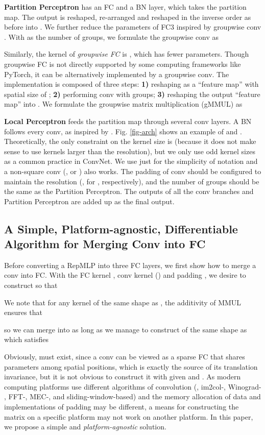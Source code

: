 \documentclass[10pt,twocolumn,letterpaper]{article}
\begin{document}
\textbf{Partition Perceptron} has an FC and a BN layer, which takes the partition map. The output  is reshaped, re-arranged and reshaped in the inverse order as before into . We further reduce the parameters of FC3 inspired by groupwise conv \cite{chollet2017xception,xie2017aggregated}. With  as the number of groups, we formulate the groupwise conv as


Similarly, the kernel of \textit{groupwise FC} is , which has  fewer parameters. Though groupwise FC is not directly supported by some computing frameworks like PyTorch, it can be alternatively implemented by a groupwise  conv. The implementation is composed of three steps: \textbf{1)} reshaping  as a ``feature map'' with spatial size of ; \textbf{2)} performing  conv with  groups; \textbf{3)} reshaping the output ``feature map'' into . We formulate the groupwise matrix multiplication (gMMUL) as



\textbf{Local Perceptron} feeds the partition map through several conv layers. A BN follows every conv, as inspired by \cite{ding2019acnet,ding2021repvgg}. Fig. \ref{fig-arch} shows an example of  and . Theoretically, the only constraint on the kernel size  is  (because it does not make sense to use kernels larger than the resolution), but we only use odd kernel sizes as a common practice in ConvNet. We use  just for the simplicity of notation and a non-square conv (\eg,  or ) also works. The padding of conv should be configured to maintain the resolution (\eg,  for , respectively), and the number of groups  should be the same as the Partition Perceptron. The outputs of all the conv branches and Partition Perceptron are added up as the final output.


\subsection{A Simple, Platform-agnostic, Differentiable Algorithm for Merging Conv into FC}
Before converting a RepMLP into three FC layers, we first show how to merge a conv into FC. With the FC kernel , conv kernel  () and padding , we desire to construct  so that


We note that for any kernel  of the same shape as , the additivity of MMUL ensures that

so we can merge  into  as long as we manage to construct  of the same shape as  which satisfies

Obviously,  must exist, since a conv can be viewed as a sparse FC that shares parameters among spatial positions, which is exactly the source of its translation invariance, but it is not obvious to construct it with given  and . As modern computing platforms use different algorithms of convolution (\eg, im2col-\cite{im2col}, Winograd- \cite{winograd}, FFT-\cite{fft-conv}, MEC-\cite{cho2017mec}, and sliding-window-based) and the memory allocation of data and implementations of padding may be different, a means for constructing the matrix on a specific platform may not work on another platform. In this paper, we propose a simple and \textit{platform-agnostic} solution.
\end{document}
